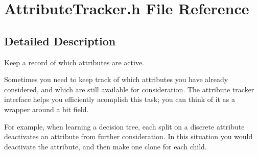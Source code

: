 \section{Attribute\-Tracker.h File Reference}
\label{AttributeTracker_8h}


\subsection{Detailed Description}
Keep a record of which attributes are active. 

Sometimes you need to keep track of which attributes you have already considered, and which are still available for consideration. The attribute tracker interface helps you efficiently acomplish this task; you can think of it as a wrapper around a bit field.

For example, when learning a decision tree, each split on a discrete attribute deactivates an attribute from further consideration. In this situation you would deactivate the attribute, and then make one clone for each child.

